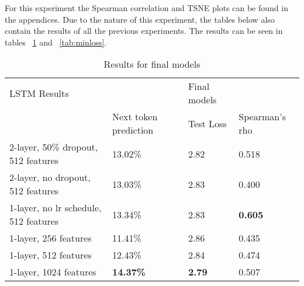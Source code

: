 For this experiment the Spearman correlation and TSNE plots can be found in the appendices. Due to the nature of this experiment, the tables below also contain the results of all the previous experiments. The results can be seen in tables ~\ref{tab:final} and ~\ref{tab:minloss}.
\begin{table}[!ht]
  \centering
\begin{tabular}{|l|lll|}
\hline
LSTM Results                          &                                                     & Final models                       &                \\ \cline{2-4}
                                      & \multicolumn{1}{l|}{Next token prediction}          & \multicolumn{1}{l|}{Test Loss}     & Spearman's rho \\ \hline
2-layer, 50\% dropout, 512 features   & \multicolumn{1}{l|}{13.02\%}                        & \multicolumn{1}{l|}{2.82}          & 0.518          \\ \hline
2-layer, no dropout, 512 features     & \multicolumn{1}{l|}{13.03\%}                        & \multicolumn{1}{l|}{2.83}          & 0.400          \\ \hline
1-layer, no lr schedule, 512 features & \multicolumn{1}{l|}{13.34\%}                        & \multicolumn{1}{l|}{2.83}          & \textbf{0.605} \\ \hline
1-layer, 256 features                 & \multicolumn{1}{l|}{11.41\%}                        & \multicolumn{1}{l|}{2.86}          & 0.435          \\ \hline
1-layer, 512 features                 & \multicolumn{1}{l|}{12.43\%}                        & \multicolumn{1}{l|}{2.84}          & 0.474          \\ \hline
1-layer, 1024 features                & \multicolumn{1}{l|}{\textbf{14.37\%}}               & \multicolumn{1}{l|}{\textbf{2.79}} & 0.507          \\ \hline
\end{tabular}
\caption{Results for final models}
\label{tab:final}
\end{table}
